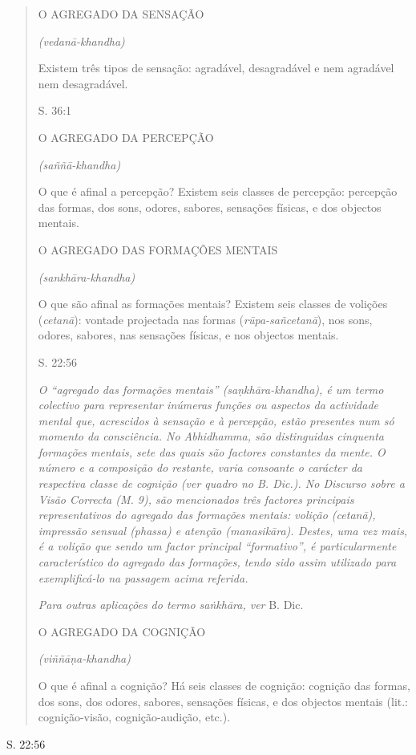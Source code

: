 \begin{quote}
O AGREGADO DA SENSAÇÃO

\emph{(vedanā-khandha)}

Existem três tipos de sensação: agradável, desagradável e nem agradável nem desagradável.

S. 36:1

O AGREGADO DA PERCEPÇÃO

\emph{(saññā-khandha)}

O que é afinal a percepção? Existem seis classes de percepção: percepção das formas, dos sons, odores, sabores, sensações físicas, e dos objectos mentais.

O AGREGADO DAS FORMAÇÕES MENTAIS

\emph{(sankhāra-khandha)}

O que são afinal as formações mentais? Existem seis classes de volições (\emph{cetanā}): vontade projectada nas formas (\emph{rūpa-sañcetanā}), nos sons, odores, sabores, nas sensações físicas, e nos objectos mentais.

S. 22:56

\emph{O ``agregado das formações mentais'' (saṇkhāra-khandha), é um termo colectivo para representar inúmeras funções ou aspectos da actividade mental que, acrescidos à sensação e à percepção, estão presentes num só momento da consciência. No Abhidhamma, são distinguidas cinquenta formações mentais, sete das quais são factores constantes da mente. O número e a composição do restante, varia consoante o carácter da respectiva classe de cognição (ver quadro no B. Dic.). No Discurso sobre a Visão Correcta (M. 9), são mencionados três factores principais representativos do agregado das formações mentais: volição (cetanā), impressão sensual (phassa) e atenção (manasikāra). Destes, uma vez mais, é a volição que sendo um factor principal ``formativo'', é particularmente característico do agregado das formações, tendo sido assim utilizado para exemplificá-lo na passagem acima referida.}

\emph{Para outras aplicações do termo saṅkhāra, ver} B. Dic.

O AGREGADO DA COGNIÇÃO

\emph{(viññāṇa-khandha)}

O que é afinal a cognição? Há seis classes de cognição: cognição das formas, dos sons, dos odores, sabores, sensações físicas, e dos objectos mentais (lit.: cognição-visão, cognição-audição, etc.).
\end{quote}

S. 22:56

